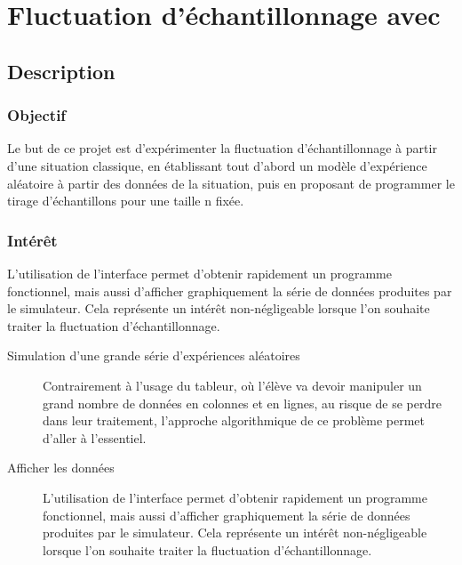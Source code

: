 \section{Fluctuation d'échantillonnage avec \mb}


%
\pagestyle{mb} %

\subsection{Description}

\subsubsection{Objectif}


\begin{formule}
Le but de ce projet est d'expérimenter la fluctuation d'échantillonnage à  partir d'une situation classique, en établissant tout d'abord un modèle d'expérience aléatoire à partir des données de la situation, puis en proposant de programmer le tirage d'échantillons pour une taille n fixée.
\end{formule}


\subsubsection{Intérêt}

 L'utilisation de l'interface \mb permet d'obtenir rapidement un programme fonctionnel, mais aussi d'afficher graphiquement la série de données produites par le simulateur. Cela représente un intérêt non-négligeable lorsque l'on souhaite traiter la fluctuation d'échantillonnage.

\begin{description}
    \item [Simulation d'une grande série d'expériences aléatoires] Contrairement à l'usage du tableur, où l'élève va devoir manipuler un grand nombre de données en colonnes et en lignes, au risque de se perdre dans leur traitement, l'approche algorithmique de  ce problème permet d'aller à l'essentiel.
    \item [Afficher les données]
    L'utilisation de l'interface \mb permet d'obtenir rapidement un programme fonctionnel, mais aussi d'afficher graphiquement la série de données produites par le simulateur. Cela représente un intérêt non-négligeable lorsque l'on souhaite traiter la fluctuation d'échantillonnage.
\end{description}


